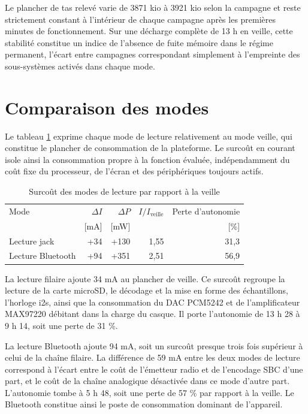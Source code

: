 Le plancher de tas relevé varie de 3871 kio à 3921 kio selon la campagne et reste strictement constant à l'intérieur de chaque campagne après les premières minutes de fonctionnement. Sur une décharge complète de 13 h en veille, cette stabilité constitue un indice de l'absence de fuite mémoire dans le régime permanent, l'écart entre campagnes correspondant simplement à l'empreinte des sous-systèmes activés dans chaque mode.

\section{Comparaison des modes}
\label{ann:autonomie:comparaison}

Le tableau \ref{tab:auton_comparaison} exprime chaque mode de lecture relativement au mode veille, qui constitue le plancher de consommation de la plateforme. Le surcoût en courant isole ainsi la consommation propre à la fonction évaluée, indépendamment du coût fixe du processeur, de l'écran et des périphériques toujours actifs.

\begin{table}[H]
    \centering
    \caption{Surcoût des modes de lecture par rapport à la veille}
    \label{tab:auton_comparaison}
    \begin{tabular}{lrrrr}
        \toprule
        Mode              & $\Delta I$ & $\Delta P$ & $I / I_\text{veille}$ & Perte d'autonomie \\
                          & [mA]       & [mW]       &                       & [\%]              \\
        \midrule
        Lecture jack      & +34        & +130       & 1,55                  & 31,3              \\
        Lecture Bluetooth & +94        & +351       & 2,51                  & 56,9              \\
        \bottomrule
    \end{tabular}
\end{table}

La lecture filaire ajoute 34 mA au plancher de veille. Ce surcoût regroupe la lecture de la carte microSD, le décodage et la mise en forme des échantillons, l'horloge \gls{i2s}, ainsi que la consommation du \gls{DAC} PCM5242 et de l'amplificateur MAX97220 débitant dans la charge du casque. Il porte l'autonomie de 13 h 28 à 9 h 14, soit une perte de 31 \%.

La lecture Bluetooth ajoute 94 mA, soit un surcoût presque trois fois supérieur à celui de la chaîne filaire. La différence de 59 mA entre les deux modes de lecture correspond à l'écart entre le coût de l'émetteur radio et de l'encodage SBC d'une part, et le coût de la chaîne analogique désactivée dans ce mode d'autre part. L'autonomie tombe à 5 h 48, soit une perte de 57 \% par rapport à la veille. Le Bluetooth constitue ainsi le poste de consommation dominant de l'appareil.

